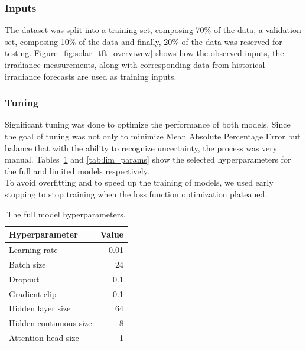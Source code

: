     \subsubsection{Inputs}
        The dataset was split into a training set, composing 70\% of the data, a validation set, composing 10\% of the data and finally, 20\% of the data was reserved for testing.
        Figure~\ref{fig:solar_tft_overviwew} shows how the observed inputs, the irradiance measurements, along with corresponding data from historical irradiance forecasts are used as training inputs.
        
    \subsubsection{Tuning}
        Significant tuning was done to optimize the performance of both models. Since the goal of tuning was not only to minimize Mean Absolute Percentage Error but balance that with the ability to recognize uncertainty, the process was very manual. Tables~\ref{tab:full_params} and \ref{tab:lim_params} show the selected hyperparameters for the full and limited models respectively.\\
        
        To avoid overfitting and to speed up the training of models, we used early stopping to stop training when the loss function optimization plateaued. 
        
        \vspace{1.5cm}
    
        \begin{table}[ht!]
        \begin{center}
        \caption{The full model hyperparameters.
        \label{tab:full_params}}
        \vspace{0.5cm}
        \begin{tabular}{|l|r|}
        \hline
        \textbf{Hyperparameter} & \textbf{Value} \\ \hline
        Learning rate            & 0.01         \\ \hline
        Batch size              & 24            \\ \hline
        Dropout                 & 0.1            \\ \hline
        Gradient clip           & 0.1           \\ \hline
        Hidden layer size            & 64         \\ \hline
        Hidden continuous size & 8         \\ \hline
        Attention head size   & 1         \\ \hline
        \end{tabular}
        
        \end{center}
        \end{table}
        
